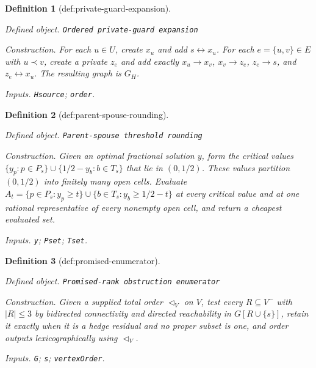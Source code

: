 \documentclass{article}
\newtheorem{definition}{Definition}
\begin{document}
\begin{definition}[def:private-guard-expansion]\label{def:private-guard-expansion}
\par\smallskip\noindent\emph{Defined object.} \texttt{Ordered private-\allowbreak{}guard expansion}
\par\smallskip\noindent\emph{Construction.} For each \(u\in U\), create \(x_u\) and add \(s\leftrightarrow x_u\). For each \(e=\{u,v\}\in E\) with \(u\prec v\), create a private \(z_e\) and add exactly \(x_u\to x_v\), \(x_v\to z_e\), \(z_e\to s\), and \(z_e\leftrightarrow x_u\). The resulting graph is \(G_H\).
\par\smallskip\noindent\emph{Inputs.} \texttt{Hsource}; \texttt{order}.
\end{definition}

\begin{definition}[def:parent-spouse-rounding]\label{def:parent-spouse-rounding}
\par\smallskip\noindent\emph{Defined object.} \texttt{Parent-\allowbreak{}spouse threshold rounding}
\par\smallskip\noindent\emph{Construction.} Given an optimal fractional solution \(y\), form the critical values
\(\{y_p:p\in P_s\}\cup\{1/2-y_b:b\in T_s\}\) that lie in \((0,1/2)\).
These values partition \((0,1/2)\) into finitely many open cells.  Evaluate
\(A_t=\{p\in P_s:y_p\geq t\}\cup\{b\in T_s:y_b\geq1/2-t\}\) at every
critical value and at one rational representative of every nonempty open
cell, and return a cheapest evaluated set.
\par\smallskip\noindent\emph{Inputs.} \texttt{y}; \texttt{Pset}; \texttt{Tset}.
\end{definition}

\begin{definition}[def:promised-enumerator]\label{def:promised-enumerator}
\par\smallskip\noindent\emph{Defined object.} \texttt{Promised-\allowbreak{}rank obstruction enumerator}
\par\smallskip\noindent\emph{Construction.} Given a supplied total order \(\triangleleft_V\) on \(V\), test every \(R\subseteq V^{-}\) with \(|R|\leq3\) by bidirected connectivity and directed reachability in \(G[R\cup\{s\}]\), retain it exactly when it is a hedge residual and no proper subset is one, and order outputs lexicographically using \(\triangleleft_V\).
\par\smallskip\noindent\emph{Inputs.} \texttt{G}; \texttt{s}; \texttt{vertexOrder}.
\end{definition}
\end{document}
